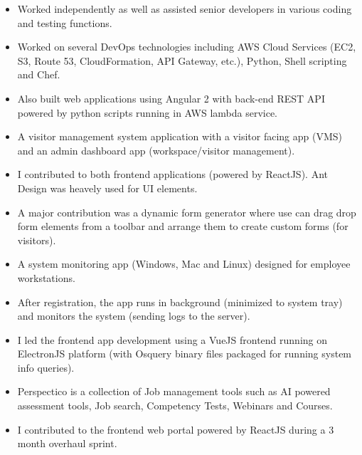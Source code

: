 \documentclass[10pt,a4paper,ragged2e]{altacv}
\begin{document}
\divider

\begin{itemize}
\item Worked independently as well as assisted senior developers in various coding and testing functions. 
\smallskip
\item Worked on several DevOps technologies including AWS Cloud Services (EC2, S3, Route 53,
CloudFormation, API Gateway, etc.), Python, Shell scripting and Chef. 
\smallskip
\item Also built web applications using Angular 2 with back-end REST API powered by python scripts running in
AWS lambda service.
\end{itemize}



\begin{itemize}
\item A visitor management system application with a visitor facing app (VMS) and an admin dashboard app (workspace/visitor management).
\item I contributed to both frontend applications (powered by ReactJS). Ant Design was heavely used for UI elements. 
\item A major contribution was a dynamic form generator where use can drag drop form elements from a toolbar and arrange them to create custom forms (for visitors).
\end{itemize}
\smallskip
\smallskip 


\begin{itemize}
\item A system monitoring app (Windows, Mac and Linux) designed for employee workstations.
\item After registration, the app runs in background (minimized to system tray) and monitors the system (sending logs to the server).
\item I led the frontend app development using a VueJS frontend running on ElectronJS platform (with Osquery binary files packaged for running system info queries).
\end{itemize}
\smallskip
\smallskip


\begin{itemize}
  \item Perspectico is a collection of Job management tools such as AI powered assessment tools, Job search, Competency Tests, Webinars and Courses.
  \item I contributed to the frontend web portal powered by ReactJS during a 3 month overhaul sprint. 
\end{itemize}
\smallskip
\smallskip 
\end{document}
